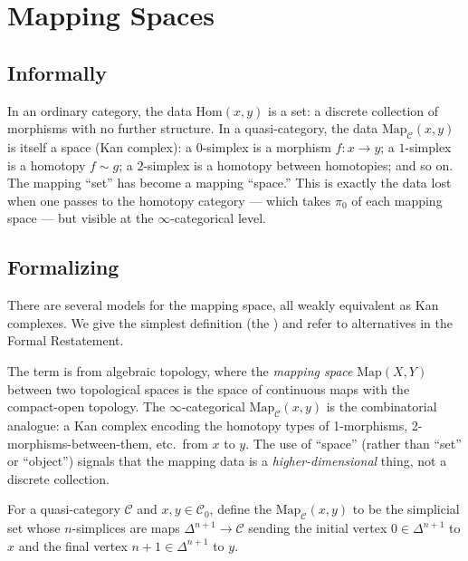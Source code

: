 \section{Mapping Spaces}
\label{sec:mapping-spaces}

\subsection{Informally}

In an ordinary category, the data $\mathrm{Hom}(x, y)$ is a set: a
discrete collection of morphisms with no further structure. In a
quasi-category, the data $\mathrm{Map}_\mathcal{C}(x, y)$ is itself a
space (Kan complex): a $0$-simplex is a morphism $f : x \to y$; a
$1$-simplex is a homotopy $f \sim g$; a $2$-simplex is a homotopy between
homotopies; and so on. The mapping ``set'' has become a mapping
``space.'' This is exactly the data lost when one passes to the
homotopy category — which takes $\pi_0$ of each mapping space — but
visible at the $\infty$-categorical level.

\subsection{Formalizing}

There are several models for the mapping space, all weakly equivalent
as Kan complexes. We give the simplest definition (the ) and refer to alternatives in the Formal Restatement.

\begin{nameorigin}
The term  is from algebraic topology, where the
\emph{mapping space} $\mathrm{Map}(X, Y)$ between two topological
spaces is the space of continuous maps with the compact-open topology.
The $\infty$-categorical $\mathrm{Map}_\mathcal{C}(x, y)$ is the
combinatorial analogue: a Kan complex encoding the homotopy types of
1-morphisms, 2-morphisms-between-them, etc.\ from $x$ to $y$. The use
of ``space'' (rather than ``set'' or ``object'') signals that the
mapping data is a \emph{higher-dimensional} thing, not a discrete
collection.
\end{nameorigin}

\begin{definition}
\label{def:slice-mapping}
For a quasi-category $\mathcal{C}$ and $x, y \in \mathcal{C}_0$, define
the  $\mathrm{Map}_\mathcal{C}(x, y)$ to be
the simplicial set whose $n$-simplices are maps $\Delta^{n+1} \to
\mathcal{C}$ sending the initial vertex $0 \in \Delta^{n+1}$ to $x$ and
the final vertex $n+1 \in \Delta^{n+1}$ to $y$.
\end{definition}

